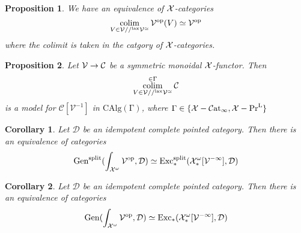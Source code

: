 \documentclass{article}
\newcommand{\cC}{\mathcal{C}}
\newcommand{\cD}{\mathcal{D}}
\newcommand{\op}{\mathrm{op}}
\newcommand{\catinfty}{\mathcal{C}\mathrm{at}_{\infty}}
\DeclareMathOperator*{\colim}{colim}
\newtheorem{proposition}{Proposition}
\newtheorem{corollary}{Corollary}
\begin{document}
\begin{proposition} We have an equivalence of $\cal X$-categories 
    \[
        \colim_{V \in \cal V //^\mathrm{lax} \cal V^\simeq} {\cal V}^{\op}(V) \simeq \cal V^\op   
    \]
    where the colimit is taken in the catgory of $\cal X$-categories.
\end{proposition}

\begin{proposition} Let $\cal V \to \cal C$ be a symmetric monoidal $\cal X$-functor.
    Then 
    \[
    \colim^{\in \Gamma}_{V \in \cal V //^\mathrm{lax} \cal V^\simeq} \cC   
    \]
    is a model for $\mathcal{C}[\mathcal{V}^{- 1}]$ in $\mathrm{CAlg(\Gamma)}$, where 
    $\Gamma \in \{\cal X -\catinfty, \cal{X} - \mathrm{Pr}^\mathrm{L} \}$
\end{proposition}

\begin{corollary}
Let $\cD$ be an idempotent complete pointed category. Then there is an 
equivalence of categories 
\[
    \mathrm{Gen}^\mathrm{split}(\int_{\cal X ^\omega} \cal V ^\op, \cD) \simeq \mathrm{Exc}^\mathrm{split}_*(\mathcal{X}^\omega_*[\mathcal{V}^{- 1}], \cD)
\]
\end{corollary}
\begin{corollary}
    Let $\cD$ be an idempotent complete pointed category. Then there is an 
    equivalence of categories 
    \[
        \mathrm{Gen}(\int_{\cal X ^\omega} \cal V ^\op, \cD) \simeq \mathrm{Exc}_*(\mathcal{X}^\omega_*[\mathcal{V}^{- 1}], \cD)
    \]
    \end{corollary}
\end{document}
